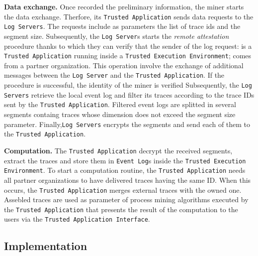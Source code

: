 \textbf{Data exchange.} Once recorded the preliminary information, the miner starts the data exchange. Therfore, its \texttt{Trusted Application} sends data requests to the \texttt{Log Servers}. The requests include as parameters the list of trace ids and the segment size. Subsequently, the \texttt{Log Server}s starts the \textit{remote attestation} procedure thanks to which they can verify that the sender of the log request: is a \texttt{Trusted Application} running inside a \texttt{Trusted Execution Environment}; comes from a partner organization. This operation involve the exchange of additional messages between the \texttt{Log Server} and the \texttt{Trusted Application}. If the procedure is successful, the identity of the miner is verified %
Subsequently, the \texttt{Log Servers} retrieve the local event log and filter its traces according to the trace IDs sent by the \texttt{Trusted Application}. Filtered event logs are splitted in several segments containg traces whose dimension does not exceed the segment size parameter. Finally,\texttt{Log Servers} encrypts the segments and send each of them to the \texttt{Trusted Application}.

\textbf{Computation.} The \texttt{Trusted Application} decrypt the received segments, extract the traces and store them in \texttt{Event Log}s inside the \texttt{Trusted Execution Environment}. To start a computation routine, the \texttt{Trusted Application} needs all partner organizations to have delivered traces having the same ID. When this occurs, the \texttt{Trusted Application} merges external traces with the owned one. Assebled traces are used as parameter of process mining algorithms executed by the \texttt{Trusted Application} that presents the result of the computation to the users via the \texttt{Trusted Application Interface}.
\subsection{Implementation}
